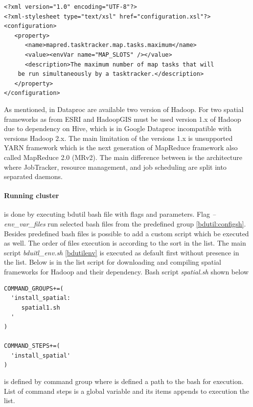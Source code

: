 \documentclass[a4paper,12pt,oneside]{report}
\begin{document}
\begin{footnotesize}\begin{lstlisting}[style=XML]
<?xml version="1.0" encoding="UTF-8"?>
<?xml-stylesheet type="text/xsl" href="configuration.xsl"?>
<configuration>
   <property>
      <name>mapred.tasktracker.map.tasks.maximum</name>
      <value><envVar name="MAP_SLOTS" /></value>
      <description>The maximum number of map tasks that will 
    be run simultaneously by a tasktracker.</description>
   </property>
</configuration>
\end{lstlisting}\end{footnotesize}


 
As mentioned, in Dataproc are available two version of Hadoop. For two spatial frameworks as from 
ESRI and HadoopGIS must be used version 1.x of Hadoop due to dependency on Hive, which is in Google 
Dataproc incompatible with versions Hadoop 2.x. The main limitation of the versions 1.x is unsupported 
YARN framework which is the next generation of MapReduce framework also called MapReduce 2.0 (MRv2)\cite{yarn}. 
The main difference between is the architecture where JobTracker, resource management, and job scheduling are split into separated daemons.



\paragraph{Running cluster} is done by executing bdutil bash file with flags and parameters.  
Flag \textit{--env\_var\_files} run selected bash files from the predefined group \ref{bdutil:configsh}. 
Besides predefined bash files is possible to add a custom script which be executed as well. The  order 
of files execution is according to the sort in the list. The main script \textit{bduitl\_env.sh} 
\ref{bdutilenv} is executed as default first without presence in the list. Below is in the list script 
for downloading and compiling spatial frameworks for Hadoop and their dependency. Bash script \textit{spatial.sh} shown below 
%
\begin{footnotesize}\begin{lstlisting}[style=python]
COMMAND_GROUPS+=(
  'install_spatial:
     spatial1.sh
  '
)

COMMAND_STEPS+=(
  'install_spatial'
)
\end{lstlisting}\end{footnotesize}
is defined by command group where is defined a path to the bash for execution. List of command steps is a
 global variable and its items appends to execution the list.
 
\end{document}
